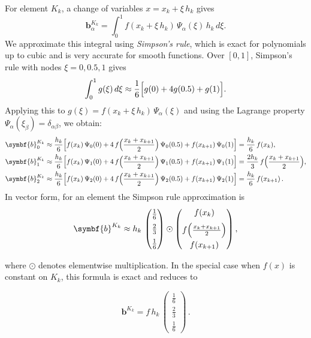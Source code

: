 \documentclass[a4paper,10pt]{article}
\begin{document}
For element \(K_k\), a change of variables \(x = x_k + \xi\,h_k\) gives
\[
	\symbf{b}^{K_k}_\alpha = \int_{0}^{1} f(x_k+\xi\,h_k)\,\Psi_\alpha(\xi)\,h_k\,d\xi.
\]
We approximate this integral using \emph{Simpson's rule}, which is exact for polynomials up to cubic and is very accurate for smooth functions. Over \([0,1]\), Simpson's rule with nodes \(\xi=0,0.5,1\) gives
\[
	\int_0^1 g(\xi)\,d\xi \approx \frac{1}{6}\Bigl[g(0) + 4g(0.5) + g(1)\Bigr].
\]
Applying this to \(g(\xi)=f(x_k+\xi\,h_k)\,\Psi_\alpha(\xi)\) and using the Lagrange property \(\Psi_\alpha(\xi_\beta)=\delta_{\alpha\beta}\), we obtain:
\begin{align*}
	\symbf{b}^{K_k}_0 & \approx \frac{h_k}{6}\Bigl[f(x_k)\,\Psi_0(0) + 4\,f\Bigl(\frac{x_k+x_{k+1}}{2}\Bigr)\,\Psi_0(0.5) + f(x_{k+1})\,\Psi_0(1)\Bigr] = \frac{h_k}{6}\,f(x_k),                              \\
	\symbf{b}^{K_k}_1 & \approx \frac{h_k}{6}\Bigl[f(x_k)\,\Psi_1(0) + 4\,f\Bigl(\frac{x_k+x_{k+1}}{2}\Bigr)\,\Psi_1(0.5) + f(x_{k+1})\,\Psi_1(1)\Bigr] = \frac{2h_k}{3}\,f\Bigl(\frac{x_k+x_{k+1}}{2}\Bigr), \\
	\symbf{b}^{K_k}_2 & \approx \frac{h_k}{6}\Bigl[f(x_k)\,\Psi_2(0) + 4\,f\Bigl(\frac{x_k+x_{k+1}}{2}\Bigr)\,\Psi_2(0.5) + f(x_{k+1})\,\Psi_2(1)\Bigr] = \frac{h_k}{6}\,f(x_{k+1})\,.
\end{align*}
In vector form, for an element the Simpson rule approximation is
\[
	\symbf{b}^{K_k} \approx h_k\,
	\begin{pmatrix}
		\tfrac{1}{6} \\[2mm]
		\tfrac{2}{3} \\[2mm]
		\tfrac{1}{6}
	\end{pmatrix}
	\odot
	\begin{pmatrix}
		f(x_k)                             \\[2mm]
		f\Bigl(\frac{x_k+x_{k+1}}{2}\Bigr) \\[2mm]
		f(x_{k+1})
	\end{pmatrix},
\]

where \(\odot\) denotes elementwise multiplication. In the special case when \(f(x)\) is constant on \(K_k\), this formula is exact and reduces to

\[
	\symbf{b}^{K_k} = f\,h_k\,
	\begin{pmatrix}
		\tfrac{1}{6} \\[2mm] 
		\tfrac{2}{3} \\[2mm] 
		\tfrac{1}{6}\end{pmatrix}\,.
\]
\end{document}
